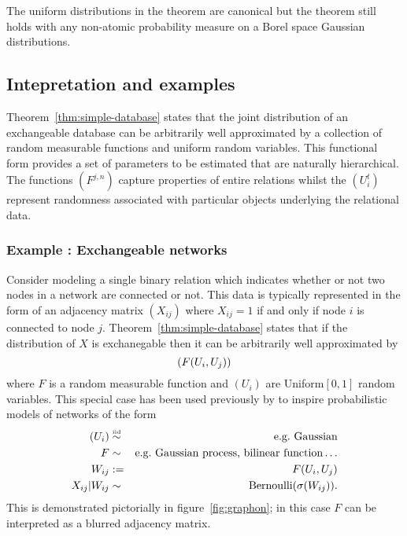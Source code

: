 \begin{rem}\label{rem:sym}
The uniform distributions in the theorem are canonical but the theorem still holds with any non-atomic probability measure on a Borel space \eg Gaussian distributions.
\end{rem}

\subsection{Intepretation and examples}

Theorem~\ref{thm:simple-database} states that the joint distribution of an exchangeable database can be arbitrarily well approximated by a collection of random measurable functions and uniform random variables.
This functional form provides a set of parameters to be estimated that are naturally hierarchical.
The functions $(F^{j,n})$ capture properties of entire relations whilst the $(U^t_i)$ represent randomness associated with particular objects underlying the relational data.

\subsubsection{Example : Exchangeable networks}

Consider modeling a single binary relation which indicates whether or not two nodes in a network are connected or not.
This data is typically represented in the form of an adjacency matrix $(X_{ij})$ where $X_{ij} = 1$ if and only if node $i$ is connected to node $j$.
Theorem~\ref{thm:simple-database} states that if the distribution of $X$ is exchanegable then it can be arbitrarily well approximated by
\begin{equation}
(F(U_i, U_j))
\end{equation}
where $F$ is a random measurable function and $(U_i)$ are \iid Uniform$[0,1]$ random variables.
This special case has been used previously by \cite{Hoff2007a,Roy2009,Lloyd2012} to inspire probabilistic models of networks of the form
\begin{eqnarray}
(U_i) & \overset{\mbox{\tiny iid}}{\sim} & \textrm{e.g.\ Gaussian} \\
F & \sim & \textrm{e.g.\ Gaussian process, bilinear function}\ldots \\
W_{ij} & := & F(U_i, U_j) \\
X_{ij} | W_{ij} & \sim & \textrm{Bernoulli}(\sigma(W_{ij}))\label{eq:graphon}.
\end{eqnarray}
This is demonstrated pictorially in figure~\ref{fig:graphon}; in this case $F$ can be interpreted as a blurred adjacency matrix.

